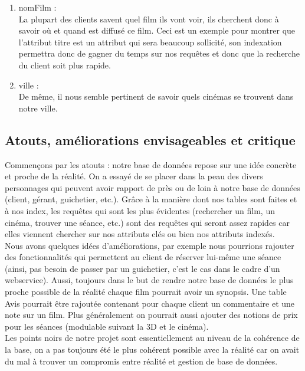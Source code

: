 \documentclass[a4paper,sffamily,12pt]{article}
\begin{document}
					\begin{enumerate}[label=\ding{228}]

						\item nomFilm : \\
						
							La plupart des clients savent quel film ils vont voir, ils cherchent donc à savoir où et quand est diffusé ce film. Ceci est un exemple pour montrer que l'attribut titre est un attribut qui sera beaucoup sollicité, son indexation permettra donc de gagner du temps sur nos requêtes et donc que la recherche du client soit plus rapide.\\
																		
						\item ville : \\
						
							De même, il nous semble pertinent de savoir quels cinémas se trouvent dans notre ville. \\					
																													
					\end{enumerate}
										
		\subsection{Atouts, améliorations envisageables et critique}
				
			\vspace{0.5cm}
			
				Commençons par les atouts : notre base de données repose sur une idée concrète et proche de la réalité. On a essayé de se placer dans la peau des divers personnages qui peuvent avoir rapport de près ou de loin à notre base de données (client, gérant, guichetier, etc.). Grâce à la manière dont nos tables sont faites et à nos index, les requêtes qui sont les plus évidentes (rechercher un film, un cinéma, trouver une séance, etc.) sont des requêtes qui seront assez rapides car elles viennent chercher sur nos attributs clés ou bien nos attributs indexés.\\
				\indent Nous avons quelques idées d'améliorations, par exemple nous pourrions rajouter des fonctionnalités qui permettent au client de réserver lui-même une séance (ainsi, pas besoin de passer par un guichetier, c'est le cas dans le cadre d'un webservice). Aussi, toujours dans le but de rendre notre base de données le plus proche possible de la réalité chaque film pourrait avoir un synopsis. Une table Avis pourrait être rajoutée contenant pour chaque client un commentaire et une note sur un film. Plus généralement on pourrait aussi ajouter des notions de prix pour les séances (modulable suivant la 3D et le cinéma).\\
				\indent Les points noirs de notre projet sont essentiellement au niveau de la cohérence de la base, on a pas toujours été le plus cohérent possible avec la réalité car on avait du mal à trouver un compromis entre réalité et gestion de base de données. \\
				
\end{document}
